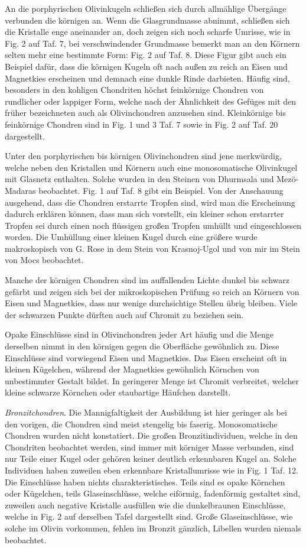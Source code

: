 \documentclass[a4paper, 12pt, oneside]{article}
\begin{document}
An die porphyrischen Olivinkugeln schließen sich durch allmählige Übergänge verbunden die körnigen an. Wenn die Glasgrundmasse abnimmt, schließen sich die Kristalle enge aneinander an, doch zeigen sich noch scharfe Umrisse, wie in Fig. 2 auf Taf. 7, bei verschwindender Grundmasse bemerkt man an den Körnern selten mehr eine bestimmte Form: Fig. 2 auf Taf. 8. Diese Figur gibt auch ein Beispiel dafür, dass die körnigen Kugeln oft nach außen zu reich an Eisen und Magnetkies erscheinen und demnach eine dunkle Rinde darbieten. Häufig sind, besonders in den kohligen Chondriten höchst feinkörnige Chondren von rundlicher oder lappiger Form, welche nach der Ähnlichkeit des Gefüges mit den früher bezeichneten auch als Olivinchondren anzusehen sind. Kleinkörnige bis feinkörnige Chondren sind in Fig. 1 und 3 Taf. 7 sowie in Fig. 2 auf Taf. 20 dargestellt.

Unter den porphyrischen bis körnigen Olivinchondren sind jene merkwürdig, welche neben den Kristallen und Körnern auch eine monosomatische Olivinkugel mit Glasnetz enthalten. Solche wurden in den Steinen von Dhurmsala und Mezö-Madaras beobachtet. Fig. 1 auf Taf. 8 gibt ein Beispiel. Von der Anschauung ausgehend, dass die Chondren erstarrte Tropfen sind, wird man die Erscheinung dadurch erklären können, dass man sich vorstellt, ein kleiner schon erstarrter Tropfen sei durch einen noch flüssigen großen Tropfen umhüllt und eingeschlossen worden. Die Umhüllung einer kleinen Kugel durch eine größere wurde makroskopisch von G. Rose in dem Stein von Krasnoj-Ugol und von mir im Stein von Mocs beobachtet.

Manche der körnigen Chondren sind im auffallenden Lichte dunkel bis schwarz gefärbt und zeigen sich bei der mikroskopischen Prüfung so reich an Körnern von Eisen und Magnetkies, dass nur wenige durchsichtige Stellen übrig bleiben. Viele der schwarzen Punkte dürften auch auf Chromit zu beziehen sein.

Opake Einschlüsse sind in Olivinchondren jeder Art häufig und die Menge derselben nimmt in den körnigen gegen die Oberfläche gewöhnlich zu. Diese Einschlüsse sind vorwiegend Eisen und Magnetkies. Das Eisen erscheint oft in kleinen Kügelchen, während der Magnetkies gewöhnlich Körnchen von unbestimmter Gestalt bildet. In geringerer Menge ist Chromit verbreitet, welcher kleine schwarze Körnchen oder staubartige Häufchen darstellt.

\emph{Bronzitchondren}. Die Mannigfaltigkeit der Ausbildung ist hier geringer als bei den vorigen, die Chondren sind meist stengelig bis faserig. Monosomatische Chondren wurden nicht konstatiert. Die großen Bronzitindividuen, welche in den Chondriten beobachtet werden, sind immer mit körniger Masse verbunden, sind nur Teile einer Kugel oder gehören keiner deutlich erkennbaren Kugel an. Solche Individuen haben zuweilen eben erkennbare Kristallumrisse wie in Fig. 1 Taf. 12. Die Einschlüsse haben nichts charakteristisches. Teils sind es opake Körnchen oder Kügelchen, teils Glaseinschlüsse, welche eiförmig, fadenförmig gestaltet sind, zuweilen auch negative Kristalle ausfüllen wie die dunkelbraunen Einschlüsse, welche in Fig. 2 auf derselben Tafel dargestellt sind. Große Glaseinschlüsse, wie solche im Olivin vorkommen, fehlen im Bronzit gänzlich, Libellen wurden niemals beobachtet.
\end{document}
